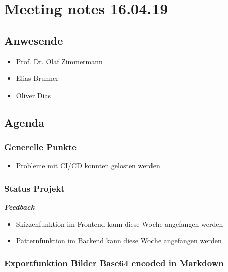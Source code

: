\hypertarget{meeting-notes-160419}{%
\section*{Meeting notes 16.04.19}\label{meeting-notes-160419}}

\hypertarget{anwesende}{%
\subsection*{Anwesende}\label{anwesende}}

\begin{itemize}

\item
  Prof. Dr. Olaf Zimmermann
\item
  Elias Brunner
\item
  Oliver Dias
\end{itemize}

\hypertarget{agenda}{%
\subsection*{Agenda}\label{agenda}}

\hypertarget{generelle-punkte}{%
\subsubsection*{Generelle Punkte}\label{generelle-punkte}}

\begin{itemize}
\item Probleme mit CI/CD konnten gelösten werden
\end{itemize}

\hypertarget{status-projekt}{%
\subsubsection*{Status Projekt}\label{status-projekt}}

\emph{\textbf{Feedback}}

\begin{itemize}

\item Skizzenfunktion im Frontend kann diese Woche angefangen werden
\item Patternfunktion im Backend kann diese Woche angefangen werden
\end{itemize}

\hypertarget{exportfunktion-bilder-base64-encoded-in-markdown}{%
\subsubsection*{Exportfunktion Bilder Base64 encoded in
Markdown}\label{exportfunktion-bilder-base64-encoded-in-markdown}}

